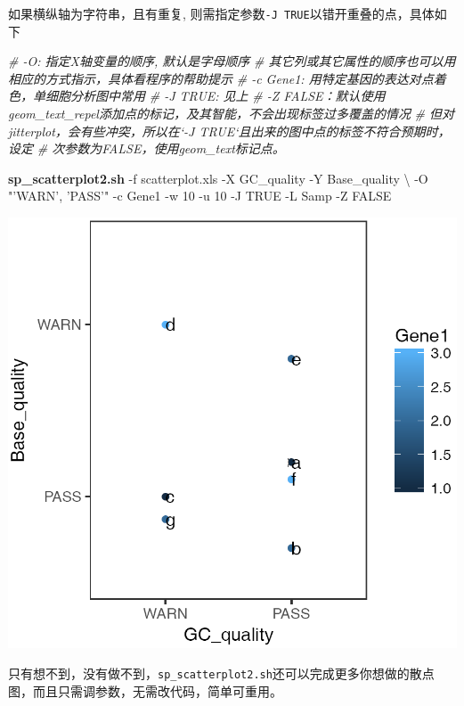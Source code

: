 \documentclass[]{article}
\newenvironment{Shaded}{\begin{snugshade}}{\end{snugshade}}
\newcommand{\KeywordTok}[1]{\textcolor[rgb]{0.13,0.29,0.53}{\textbf{{#1}}}}
\newcommand{\StringTok}[1]{\textcolor[rgb]{0.31,0.60,0.02}{{#1}}}
\newcommand{\CommentTok}[1]{\textcolor[rgb]{0.56,0.35,0.01}{\textit{{#1}}}}
\newcommand{\NormalTok}[1]{{#1}}
\numberwithin{figure}{section}
\numberwithin{table}{section}
\theoremstyle{definition}
\theoremstyle{definition}
\theoremstyle{definition}
\theoremstyle{remark}
\begin{document}
如果横纵轴为字符串，且有重复,
则需指定参数\texttt{-J\ TRUE}以错开重叠的点，具体如下

\begin{Shaded}
\begin{Highlighting}[]
\CommentTok{# -O: 指定X轴变量的顺序, 默认是字母顺序}
\CommentTok{# 其它列或其它属性的顺序也可以用相应的方式指示，具体看程序的帮助提示}
\CommentTok{# -c Gene1: 用特定基因的表达对点着色，单细胞分析图中常用}
\CommentTok{# -J TRUE: 见上}
\CommentTok{# -Z FALSE：默认使用geom_text_repel添加点的标记，及其智能，不会出现标签过多覆盖的情况}
\CommentTok{# 但对jitterplot，会有些冲突，所以在`-J TRUE`且出来的图中点的标签不符合预期时，设定}
\CommentTok{# 次参数为FALSE，使用geom_text标记点。}

\KeywordTok{sp_scatterplot2.sh} \NormalTok{-f scatterplot.xls -X GC_quality -Y Base_quality \textbackslash{}}
        \NormalTok{-O }\StringTok{"'WARN', 'PASS'"} \NormalTok{-c Gene1 -w 10 -u 10 -J TRUE -L Samp -Z FALSE}
\end{Highlighting}
\end{Shaded}

\begin{center}\includegraphics[width=0.95\linewidth,height=0.7\textheight,keepaspectratio]{images/scatterplot7} \end{center}

只有想不到，没有做不到，\texttt{sp\_scatterplot2.sh}还可以完成更多你想做的散点图，而且只需调参数，无需改代码，简单可重用。
\end{document}

